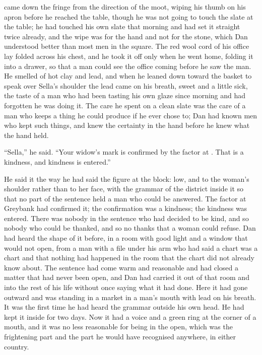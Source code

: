 \scenebreak

 came down the fringe from the direction of the moot, wiping his thumb on his apron before he reached the table, though he was not going to touch the slate at the table; he had touched his own slate that morning and had set it straight twice already, and the wipe was for the hand and not for the stone, which Dan understood better than most men in the square. The red wool cord of his office lay folded across his chest, and he took it off only when he went home, folding it into a drawer, so that a man could see the office coming before he saw the man. He smelled of hot clay and lead, and when he leaned down toward the basket to speak over Sella's shoulder the lead came on his breath, sweet and a little sick, the taste of a man who had been tasting his own glaze since morning and had forgotten he was doing it. The care he spent on a clean slate was the care of a man who keeps a thing he could produce if he ever chose to; Dan had known men who kept such things, and knew the certainty in the hand before he knew what the hand held.

“Sella,” he said. “Your widow's mark is confirmed by the factor at . That is a kindness, and kindness is entered.”

He said it the way he had said the figure at the block: low, and to the woman's shoulder rather than to her face, with the grammar of the district inside it so that no part of the sentence held a man who could be answered. The factor at Greybank had confirmed it; the confirmation was a kindness; the kindness was entered. There was nobody in the sentence who had decided to be kind, and so nobody who could be thanked, and so no thanks that a woman could refuse. Dan had heard the shape of it before, in a room with good light and a window that would not open, from a man with a file under his arm who had said a chart was a chart and that nothing had happened in the room that the chart did not already know about.  The sentence had come warm and reasonable and had closed a matter that had never been open, and Dan had carried it out of that room and into the rest of his life without once saying what it had done. Here it had gone outward and was standing in a market in a man's mouth with lead on his breath. It was the first time he had heard the grammar outside his own head. He had kept it inside for two days. Now it had a voice and a green ring at the corner of a mouth, and it was no less reasonable for being in the open, which was the frightening part and the part he would have recognised anywhere, in either country.

